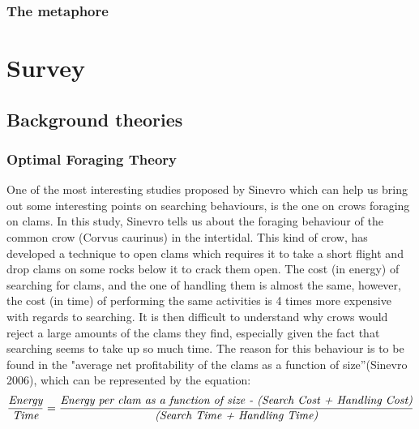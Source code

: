 \documentclass{mproj}
\begin{document}
\subsection{The metaphore}


\chapter{Survey}\label{survey}

\section{Background theories }

\subsection{Optimal Foraging Theory}
One of the most interesting studies proposed by Sinevro which can help us bring out some interesting points on searching behaviours, is the one on crows foraging on clams. In this study, Sinevro tells us about the foraging behaviour of the common crow (Corvus caurinus) in the intertidal. This kind of crow, has developed a technique to open clams which requires it to take a short flight and drop clams on some rocks below it to crack them open. The cost (in energy) of searching for clams, and the one of handling them is almost the same, however, the cost (in time) of performing the same activities is 4 times more expensive with regards to searching. It is then difficult to understand why crows would reject a large amounts of the clams they find, especially given the fact that searching seems to take up so much time. The reason for this behaviour is to be found in the "average net profitability of the clams as a function of size”(Sinevro 2006), which can be represented by the equation:
\begin{equation*}
\frac{\emph{Energy}}{ \emph{Time}} = \frac {\emph{Energy per clam as a function of size - (Search Cost + Handling Cost)}}{ \emph{(Search Time + Handling Time)}}
\end{equation*}
\end{document}
